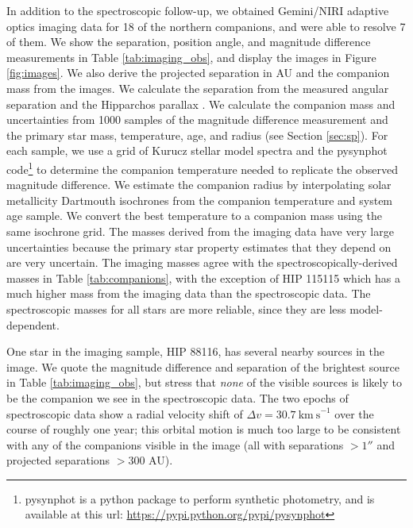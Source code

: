 \documentclass{emulateapj}
\begin{document}
In addition to the spectroscopic follow-up, we obtained Gemini/NIRI adaptive optics imaging data for 18 of the northern companions, and were able to resolve 7 of them. We show the separation, position angle, and magnitude difference measurements in Table \ref{tab:imaging_obs}, and display the images in Figure \ref{fig:images}. We also derive the projected separation in AU and the companion mass from the images. We calculate the separation from the measured angular separation and the Hipparchos parallax \citep{VanLeeuwen2007}. We calculate the companion mass and uncertainties from 1000 samples of the magnitude difference measurement and the primary star mass, temperature, age, and radius (see Section \ref{sec:sp}). For each sample, we use a grid of Kurucz stellar model spectra \citep{Castelli2003}and the pysynphot code\footnote{pysynphot is a python package to perform synthetic photometry, and is available at this url: \url{https://pypi.python.org/pypi/pysynphot}} to determine the companion temperature needed to replicate the observed magnitude difference. We estimate the companion radius by interpolating solar metallicity Dartmouth isochrones \citep{Dotter2008} from the companion temperature and system age sample. We convert the best temperature to a companion mass using the same isochrone grid. The masses derived from the imaging data have very large uncertainties because the primary star property estimates that they depend on are very uncertain. The imaging masses agree with the spectroscopically-derived masses in Table \ref{tab:companions}, with the exception of HIP 115115 which has a much higher mass from the imaging data than the spectroscopic data. The spectroscopic masses for all stars are more reliable, since they are less model-dependent.

One star in the imaging sample, HIP 88116, has several nearby sources in the image. We quote the magnitude difference and separation of the brightest source in Table \ref{tab:imaging_obs}, but stress that \emph{none} of the visible sources is likely to be the companion we see in the spectroscopic data. The two epochs of spectroscopic data show a radial velocity shift of $\Delta v = 30.7\ \mathrm{km\ s}^{-1}$ over the course of roughly one year; this orbital motion is much too large to be consistent with any of the companions visible in the image (all with separations $ > 1''$ and projected separations $ > 300$ AU).
\end{document}
